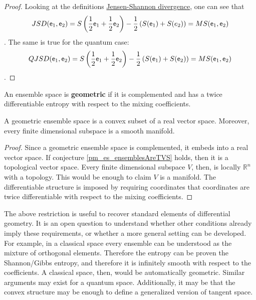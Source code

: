 \begin{proof}
	Looking at the definitions \href{https://en.wikipedia.org/wiki/Jensen%E2%80%93Shannon_divergence}{Jensen-Shannon divergence}, one can see that
	$$ JSD(\mathsf{e}_1, \mathsf{e}_2) = S\left(\frac{1}{2}\mathsf{e}_1 + \frac{1}{2}\mathsf{e}_2 \right)  - \frac{1}{2} \left(S(\mathsf{e}_1) + S(e_2)\right) = MS(\mathsf{e}_1, \mathsf{e}_2)$$.
	The same is true for the quantum case:
	$$ QJSD(\mathsf{e}_1, \mathsf{e}_2) = S\left(\frac{1}{2}\mathsf{e}_1 + \frac{1}{2}\mathsf{e}_2 \right)  - \frac{1}{2} \left(S(\mathsf{e}_1) + S(\mathsf{e}_2)\right) = MS(\mathsf{e}_1, \mathsf{e}_2)$$.
\end{proof}

\begin{defn}
	An ensemble space is \textbf{geometric} if it is complemented and has a twice differentiable entropy with respect to the mixing coefficients.
\end{defn}

\begin{conj}
	A geometric ensemble space is a convex subset of a real vector space. Moreover, every finite dimensional subspace is a smooth manifold.
\end{conj}

\begin{proof}
	Since a geometric ensemble space is complemented, it embeds into a real vector space. If conjecture \ref{pm_es_ensemblesAreTVS} holds, then it is a topological vector space. Every finite dimensional subspace $V$, then, is locally $\mathbb{R}^n$ with a topology. This would be enough to claim $V$ is a manifold. The differentiable structure is imposed by requiring coordinates that coordinates are twice differentiable with respect to the mixing coefficients.
\end{proof}

\begin{remark}
	The above restriction is useful to recover standard elements of differential geometry. It is an open question to understand whether other conditions already imply these requirements, or whether a more general setting can be developed. For example, in a classical space every ensemble can be understood as the mixture of orthogonal elements. Therefore the entropy can be proven the Shannon/Gibbs entropy, and therefore it is infinitely smooth with respect to the coefficients. A classical space, then, would be automatically geometric. Similar arguments may exist for a quantum space. Additionally, it may be that the convex structure may be enough to define a generalized version of tangent space.
\end{remark}


